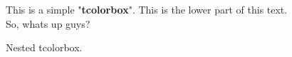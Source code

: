 \documentclass[11 pt]{article}
\begin{document}
 \begin{tcolorbox}[title = Title Bar, colback = blue!21, colframe = black!90]
  This is a simple "\textbf{tcolorbox}".
  \tcblower
  This is the lower part of this text.\\So, whats up guys?
  
   \begin{tcolorbox}[title = NEST, colframe = blue!99]
    Nested tcolorbox.
   \end{tcolorbox}
   
 \end{tcolorbox}
 
 
 \begin{tcolorbox}
 \end{tcolorbox}
 
\end{document}
